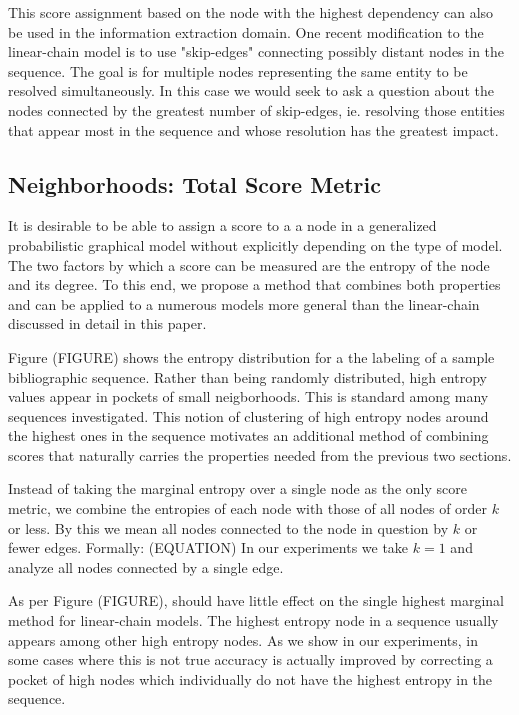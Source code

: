 This score assignment based on the node with the highest dependency can also be used in the information extraction domain.  One recent modification to the linear-chain model is to use "skip-edges" connecting possibly distant nodes in the sequence.  The goal is for multiple nodes representing the same entity to be resolved simultaneously.  In this case we would seek to ask a question about the nodes connected by the greatest number of skip-edges, ie. resolving those entities that appear most in the sequence and whose resolution has the greatest impact.

\subsection{Neighborhoods: Total Score Metric}
It is desirable to be able to assign a score to a a node in a generalized probabilistic graphical model without explicitly depending on the type of model.  The two factors by which a score can be measured are the entropy of the node and its degree.  To this end, we propose a method that combines both properties and can be applied to a numerous models more general than the linear-chain discussed in detail in this paper.

Figure (FIGURE) shows the entropy distribution for a the labeling of a sample bibliographic sequence.  Rather than being randomly distributed, high entropy values appear in pockets of small neigborhoods.  This is standard among many sequences investigated.  This notion of clustering of high entropy nodes around the highest ones in the sequence motivates an additional method of combining scores that naturally carries the properties needed from the previous two sections.

Instead of taking the marginal entropy over a single node as the only score metric, we combine the entropies of each node with those of all nodes of order $k$ or less.  By this we mean all nodes connected to the node in question by $k$ or fewer edges.  Formally:
(EQUATION)
In our experiments we take $k=1$ and analyze all nodes connected by a single edge.  

As per Figure (FIGURE), should have little effect on the single highest marginal method for linear-chain models.  The highest entropy node in a sequence usually appears among other high entropy nodes.  As we show in our experiments, in some cases where this is not true accuracy is actually improved by correcting a pocket of high nodes which individually do not have the highest entropy in the sequence.

